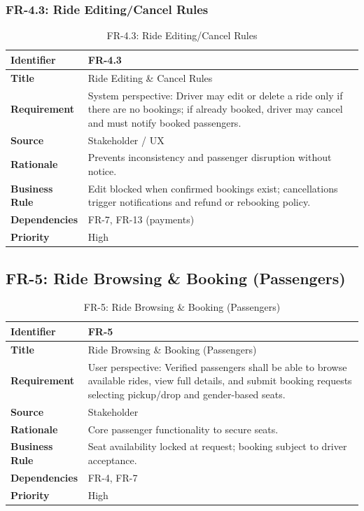 \subsubsection{FR-4.3: Ride Editing/Cancel Rules}

\begin{longtable}{|p{3cm}|p{12cm}|}
\caption{FR-4.3: Ride Editing/Cancel Rules}
\label{tab:fr-4-3} \\
\hline
\rowcolor{lightgray!30}
\textbf{Identifier} & FR-4.3 \\
\hline
\textbf{Title} & Ride Editing \& Cancel Rules \\
\hline
\textbf{Requirement} & System perspective: Driver may edit or delete a ride only if there are no bookings; if already booked, driver may cancel and must notify booked passengers. \\
\hline
\textbf{Source} & Stakeholder / UX \\
\hline
\textbf{Rationale} & Prevents inconsistency and passenger disruption without notice. \\
\hline
\textbf{Business Rule} & Edit blocked when confirmed bookings exist; cancellations trigger notifications and refund or rebooking policy. \\
\hline
\textbf{Dependencies} & FR-7, FR-13 (payments) \\
\hline
\textbf{Priority} & High \\
\hline
\end{longtable}

\subsection{FR-5: Ride Browsing \& Booking (Passengers)}

\begin{longtable}{|p{3cm}|p{12cm}|}
\caption{FR-5: Ride Browsing \& Booking (Passengers)}
\label{tab:fr-5} \\
\hline
\rowcolor{lightgray!30}
\textbf{Identifier} & FR-5 \\
\hline
\textbf{Title} & Ride Browsing \& Booking (Passengers) \\
\hline
\textbf{Requirement} & User perspective: Verified passengers shall be able to browse available rides, view full details, and submit booking requests selecting pickup/drop and gender-based seats. \\
\hline
\textbf{Source} & Stakeholder \\
\hline
\textbf{Rationale} & Core passenger functionality to secure seats. \\
\hline
\textbf{Business Rule} & Seat availability locked at request; booking subject to driver acceptance. \\
\hline
\textbf{Dependencies} & FR-4, FR-7 \\
\hline
\textbf{Priority} & High \\
\hline
\end{longtable}

